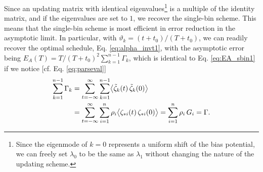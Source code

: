 \documentclass[reprint, superscriptaddress, floatfix]{revtex4-1}
\newcommand{\note}[1]{{\color{DarkGreen}\footnotesize \textsc{Note.} #1}}
\newcommand{\Err}{E}
\begin{document}
Since an updating matrix
with identical eigenvalues\footnote{Since
  the eigenmode of $k = 0$ represents
  a uniform shift of the bias potential,
  we can freely set $\lambda_0$ to be
  the same as $\lambda_1$
  without changing the nature of
  the updating scheme.}
is a multiple of the identity matrix,
%
and if the eigenvalues are set to $1$,
we recover the single-bin scheme.
%
This means that the single-bin scheme is most efficient
in error reduction in the asymptotic limit.
%
In particular,
with $\vartheta_k = (t+t_0)/(T+t_0)$,
we can readily recover the optimal schedule,
Eq. \eqref{eq:alpha_invt1}, with
the asymptotic error being
$\Err_A(T) = T / (T + t_0)^2 \sum_{ k = 1 }^{n-1} \Gamma_k$,
%
%
which is identical to Eq. \eqref{eq:EA_sbin1}
if we notice [cf. Eq. \eqref{eq:parseval}]
%
%
\begin{align}
  \sum_{k=1}^{n-1} \Gamma_k
  &=
  \sum_{t=-\infty}^\infty \sum_{k=1}^{n-1}
  \bigl\langle {\tilde \zeta}_k(t) \, {\tilde \zeta}_k(0) \bigr\rangle
  \notag
  \\
  &=
  \sum_{t=-\infty}^\infty \sum_{i=1}^n
  \rho_i \bigl\langle \zeta_{*i}(t) \, \zeta_{*i}(0) \bigr\rangle
  = \sum_{i=1}^n \rho_i \, G_i = \Gamma
  .
  \notag
\end{align}
%
%
\end{document}

